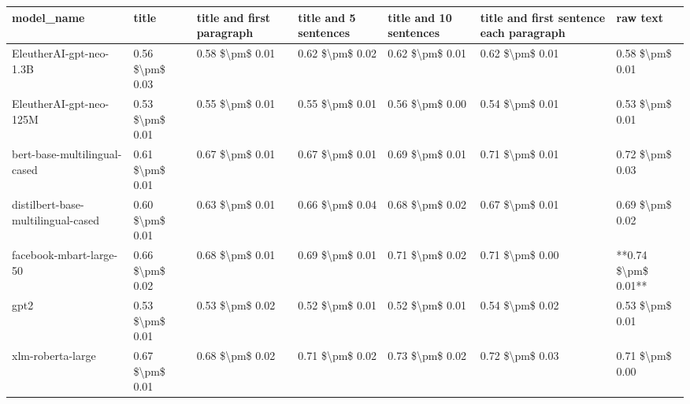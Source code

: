 \begin{tabular}{lllllll}
\toprule
                        model\_name &           title & title and first paragraph & title and 5 sentences & title and 10 sentences & title and first sentence each paragraph &            raw text \\
\midrule
           EleutherAI-gpt-neo-1.3B & 0.56 \$\textbackslash pm\$ 0.03 &           0.58 \$\textbackslash pm\$ 0.01 &       0.62 \$\textbackslash pm\$ 0.02 &        0.62 \$\textbackslash pm\$ 0.01 &                         0.62 \$\textbackslash pm\$ 0.01 &     0.58 \$\textbackslash pm\$ 0.01 \\
           EleutherAI-gpt-neo-125M & 0.53 \$\textbackslash pm\$ 0.01 &           0.55 \$\textbackslash pm\$ 0.01 &       0.55 \$\textbackslash pm\$ 0.01 &        0.56 \$\textbackslash pm\$ 0.00 &                         0.54 \$\textbackslash pm\$ 0.01 &     0.53 \$\textbackslash pm\$ 0.01 \\
      bert-base-multilingual-cased & 0.61 \$\textbackslash pm\$ 0.01 &           0.67 \$\textbackslash pm\$ 0.01 &       0.67 \$\textbackslash pm\$ 0.01 &        0.69 \$\textbackslash pm\$ 0.01 &                         0.71 \$\textbackslash pm\$ 0.01 &     0.72 \$\textbackslash pm\$ 0.03 \\
distilbert-base-multilingual-cased & 0.60 \$\textbackslash pm\$ 0.01 &           0.63 \$\textbackslash pm\$ 0.01 &       0.66 \$\textbackslash pm\$ 0.04 &        0.68 \$\textbackslash pm\$ 0.02 &                         0.67 \$\textbackslash pm\$ 0.01 &     0.69 \$\textbackslash pm\$ 0.02 \\
           facebook-mbart-large-50 & 0.66 \$\textbackslash pm\$ 0.02 &           0.68 \$\textbackslash pm\$ 0.01 &       0.69 \$\textbackslash pm\$ 0.01 &        0.71 \$\textbackslash pm\$ 0.02 &                         0.71 \$\textbackslash pm\$ 0.00 & **0.74 \$\textbackslash pm\$ 0.01** \\
                              gpt2 & 0.53 \$\textbackslash pm\$ 0.01 &           0.53 \$\textbackslash pm\$ 0.02 &       0.52 \$\textbackslash pm\$ 0.01 &        0.52 \$\textbackslash pm\$ 0.01 &                         0.54 \$\textbackslash pm\$ 0.02 &     0.53 \$\textbackslash pm\$ 0.01 \\
                 xlm-roberta-large & 0.67 \$\textbackslash pm\$ 0.01 &           0.68 \$\textbackslash pm\$ 0.02 &       0.71 \$\textbackslash pm\$ 0.02 &        0.73 \$\textbackslash pm\$ 0.02 &                         0.72 \$\textbackslash pm\$ 0.03 &     0.71 \$\textbackslash pm\$ 0.00 \\
\bottomrule
\end{tabular}
